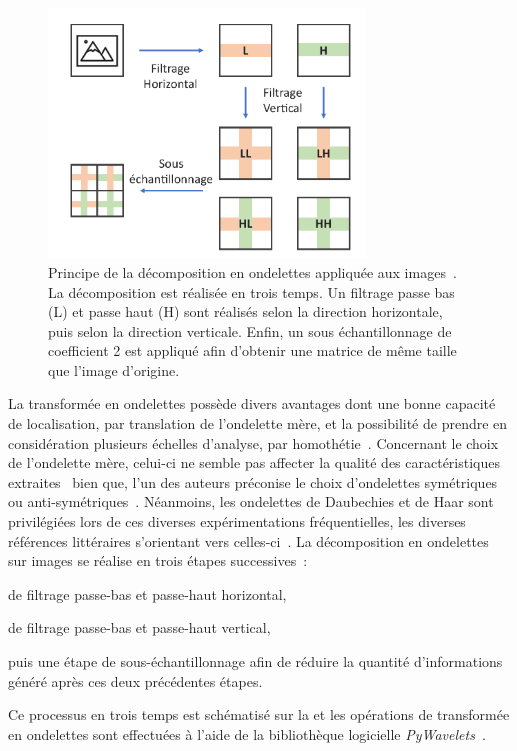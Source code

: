 \begin{figure}[H]
    \centering
    \includegraphics[width=0.75\textwidth]{contents/chapter_4/resources/scheme_dwt.pdf}
    \caption{Principe de la décomposition en ondelettes appliquée aux images~\cite{Livens1997}. La décomposition est réalisée en trois temps. Un filtrage passe bas (L) et passe haut (H) sont réalisés selon la direction horizontale, puis selon la direction verticale. Enfin, un sous échantillonnage de coefficient 2 est appliqué afin d'obtenir une matrice de même taille que l'image d'origine.}
    \label{fig:scheme_dwt}
\end{figure}\par 

La transformée en ondelettes possède divers avantages dont une bonne capacité de localisation, par translation de l'ondelette mère, et la possibilité de prendre en considération plusieurs échelles d'analyse, par homothétie~\cite{Livens1997,Wiltgen2008}. Concernant le choix de l'ondelette mère, celui-ci ne semble pas affecter la qualité des caractéristiques extraites~\cite{Fatemi1996, Livens1997} bien que, l'un des auteurs préconise le choix d'ondelettes symétriques ou anti-symétriques~\cite{Livens1997}. Néanmoins, les ondelettes de Daubechies et de Haar sont privilégiées lors de ces diverses expérimentations fréquentielles, les diverses références littéraires s'orientant vers  celles-ci~\cite{Wiltgen2008,Halimi2017a}. La décomposition en ondelettes sur images se réalise en trois étapes successives~: 
\begin{inlinerate}
    \item de filtrage passe-bas et passe-haut horizontal,
    \item de filtrage passe-bas et passe-haut vertical,
    \item puis une étape de sous-échantillonnage afin de réduire la quantité d'informations généré après ces deux précédentes étapes.
\end{inlinerate} Ce processus en trois temps est schématisé sur la  et les opérations de transformée en ondelettes sont effectuées à l'aide de la bibliothèque logicielle \textit{PyWavelets}~\cite{lee2006}.\par

